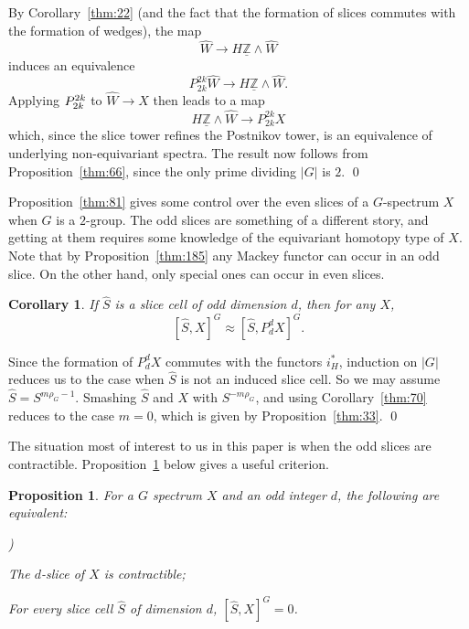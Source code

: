 \documentclass{amsart}
\newtheorem{cor}[equation]{Corollary}
\newtheorem{prop}[equation]{Proposition}
\theoremstyle{definition}
\theoremstyle{remark}
\newenvironment{pf}{\bigskip{\em Proof:\/}}{\qed\medskip}
\newcommand{\Z}{{\mathbb Z}}
\newcounter{thmItem}
\newenvironment{thmList}{\begin{list}%
{\rm \roman{thmItem})}{\usecounter{thmItem}
\setlength{\labelwidth}{2em}
\setlength{\itemindent}{2em}
\setlength{\leftmargin}{0pt}
\setlength{\listparindent}{0pt}
\setlength{\parsep}{0pt}
\setlength{\partopsep}{0pt}
\setlength{\itemsep}{\medskipamount}
\setlength{\topsep}{\medskipamount}
}}{\end{list}}
\newcommand{\slc}[2]{P_{#1}^{#1}#2}
\newcommand{\Zm}{\underline{\Z}}
\newcommand{\slicecell}{\widehat{S}}
\newcommand{\refine}{\widehat{W}}
\begin{document}
\begin{pf}
By Corollary~\ref{thm:22} (and the fact that the formation of slices
commutes with the formation of wedges), the map
\[
\refine\to H\Zm\wedge\refine
\]
induces an equivalence
\[
\slc{2k}\refine\to H\Zm\wedge\refine.
\]
Applying $\slc{2k}$ to $\refine\to X$ then leads to a map
\[
H\Zm\wedge \refine \to\slc{2k}{X}
\]
which, since the slice tower refines the Postnikov tower, is an
equivalence of underlying non-equivariant spectra.  The result now
follows from Proposition~\ref{thm:66}, since the only prime dividing
$|G|$ is $2$.
\end{pf}

Proposition~\ref{thm:81} gives some control over the even slices of a
$G$-spectrum $X$ when $G$ is a $2$-group.  The odd slices are
something of a different story, and getting at them requires some
knowledge of the equivariant homotopy type of $X$.  Note that by
Proposition~\ref{thm:185} any Mackey functor can occur in an odd
slice.  On the other hand, only special ones can occur in even slices.

\begin{cor}\label{thm:86}
If $\slicecell$ is a slice cell of odd dimension $d$, then  for any $X$,
\[
[\slicecell,X]^{G} \approx [\slicecell,\slc{d}{X}]^{G}.
\]
\end{cor}

\begin{pf}
Since the formation of $\slc{d}{X}$ commutes with the functors
$i_{H}^{\ast}$, induction on $|G|$ reduces us to the case when
$\slicecell$ is not an induced slice cell.  So we may assume
$\slicecell=S^{m\rho_{G}-1}$.  Smashing $\slicecell$ and $X$ with
$S^{-m\rho_{G}}$, and using Corollary~\ref{thm:70} reduces to the case
$m=0$, which is given by Proposition~\ref{thm:33}.
\end{pf}

The situation most of interest to us in this paper is when the odd
slices are contractible.  Proposition~\ref{thm:85} below gives a
useful criterion.

\begin{prop}
\label{thm:85} For a $G$ spectrum $X$ and an odd integer $d$, the
following are equivalent:

\begin{thmList}
\item The $d$-slice of $X$ is contractible;
\item For every slice cell $\slicecell$ of dimension $d$, $[\slicecell,X]^{G}=0$.
\end{thmList}
\end{prop}
\end{document}
